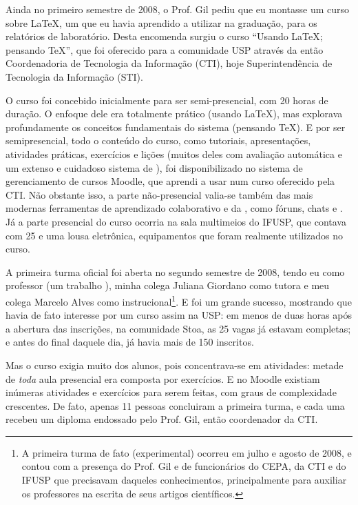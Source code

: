 Ainda no primeiro semestre de 2008, o Prof. Gil pediu que eu montasse um curso sobre \LaTeX, um  que eu havia aprendido a utilizar na graduação, para os relatórios de laboratório. Desta encomenda surgiu o curso ``Usando \LaTeX; pensando \TeX'', que foi oferecido para a comunidade USP através da então Coordenadoria de Tecnologia da Informação (CTI), hoje Superintendência de Tecnologia da Informação (STI).

O curso foi concebido inicialmente para ser semi-presencial, com 20 horas de duração. O enfoque dele era totalmente prático (usando \LaTeX), mas explorava profundamente os conceitos fundamentais do sistema (pensando \TeX). E por ser semipresencial, todo o conteúdo do curso, como tutoriais, apresentações, atividades práticas, exercícios e lições (muitos deles com avaliação automática e um extenso e cuidadoso sistema de ), foi disponibilizado no sistema de gerenciamento de cursos Moodle, que aprendi a usar num curso oferecido pela CTI. Não obstante isso, a parte não-presencial valia-se também das mais modernas ferramentas de aprendizado colaborativo e da , como fóruns, chats e . Já a parte presencial do curso ocorria na sala multimeios do IFUSP, que contava com 25  e uma lousa eletrônica, equipamentos que foram realmente utilizados no curso.

A primeira turma oficial foi aberta no segundo semestre de 2008, tendo eu como professor (um trabalho ), minha colega Juliana Giordano como tutora e meu colega Marcelo Alves como  instrucional\footnote{A primeira turma de fato (experimental) ocorreu em julho e agosto de 2008, e contou com a presença do Prof. Gil e de funcionários do CEPA, da CTI e do IFUSP que precisavam daqueles conhecimentos, principalmente para auxiliar os professores na escrita de seus artigos científicos.}. E foi um grande sucesso, mostrando que havia de fato interesse por um curso assim na USP: em menos de duas horas após a abertura das inscrições, na comunidade Stoa, as 25 vagas já estavam completas; e antes do final daquele dia, já havia mais de 150 inscritos.

Mas o curso exigia muito dos alunos, pois concentrava-se em atividades: metade de \emph{toda} aula presencial era composta por exercícios. E no Moodle existiam inúmeras atividades e exercícios para serem feitas, com graus de complexidade crescentes. De fato, apenas 11 pessoas concluiram a primeira turma, e cada uma recebeu um diploma endossado pelo Prof. Gil, então coordenador da CTI.

